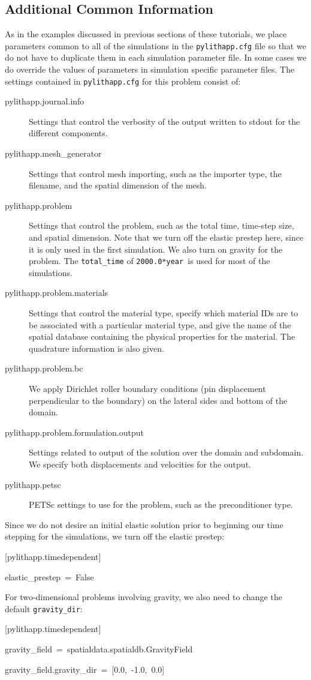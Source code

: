 \subsection{Additional Common Information}

As in the examples discussed in previous sections of these tutorials,
we place parameters common to all of the simulations in the \texttt{pylithapp.cfg}
file so that we do not have to duplicate them in each simulation parameter
file. In some cases we do override the values of parameters in simulation
specific parameter files. The settings contained in \texttt{pylithapp.cfg}
for this problem consist of:
\begin{description}
\item [{pylithapp.journal.info}] Settings that control the verbosity of
the output written to stdout for the different components.
\item [{pylithapp.mesh\_generator}] Settings that control mesh importing,
such as the importer type, the filename, and the spatial dimension
of the mesh.
\item [{pylithapp.problem}] Settings that control the problem, such as
the total time, time-step size, and spatial dimension. Note that we
turn off the elastic prestep here, since it is only used in the first
simulation. We also turn on gravity for the problem. The \texttt{total\_time}
of \texttt{2000.0{*}year }is used for most of the simulations.
\item [{pylithapp.problem.materials}] Settings that control the material
type, specify which material IDs are to be associated with a particular
material type, and give the name of the spatial database containing
the physical properties for the material. The quadrature information
is also given.
\item [{pylithapp.problem.bc}] We apply Dirichlet roller boundary conditions
(pin displacement perpendicular to the boundary) on the lateral sides
and bottom of the domain.
\item [{pylithapp.problem.formulation.output}] Settings related to output
of the solution over the domain and subdomain. We specify both displacements
and velocities for the output.
\item [{pylithapp.petsc}] PETSc settings to use for the problem, such as
the preconditioner type.
\end{description}
Since we do not desire an initial elastic solution prior to beginning
our time stepping for the simulations, we turn off the elastic prestep:
\begin{lyxcode}
{[}pylithapp.timedependent{]}

elastic\_prestep~=~False
\end{lyxcode}
For two-dimensional problems involving gravity, we also need to change
the default \texttt{gravity\_dir}:
\begin{lyxcode}
{[}pylithapp.timedependent{]}

gravity\_field~=~spatialdata.spatialdb.GravityField

gravity\_field.gravity\_dir~=~{[}0.0,~-1.0,~0.0{]}
\end{lyxcode}


